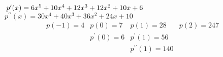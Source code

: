 \documentclass[12pt]{article}
\begin{document}
$\hspace*{0.8mm}p^\prime(x) = 6 x^5 + 10 x^4 + 12 x^3 + 12 x^2  + 10 x + 6  $\\
$p^{\prime\prime}(x) = 30 x^4 + 40 x^3+ 36 x^2 + 24 x + 10  $\\
$$
    \begin{matrix}
        p(-1) = 4 & p(0) = 7        & p(1) = 28                 & p(2) = 247 \\
                  & p^\prime(0) = 6 & p^\prime(1) = 56          &            \\
                  &                 & p^{\prime\prime}(1) = 140 &            \\
    \end{matrix}
$$
\end{document}
